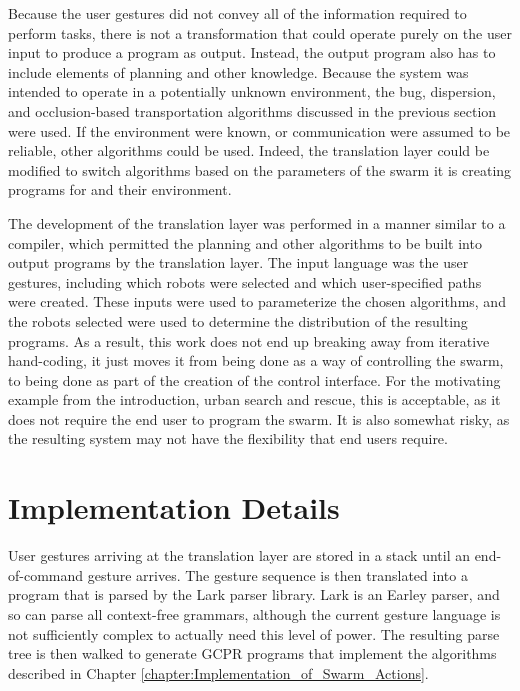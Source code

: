 Because the user gestures did not convey all of the information required to perform tasks, there is not a transformation that could operate purely on the user input to produce a program as output. 
Instead, the output program also has to include elements of planning and other knowledge. 
Because the system was intended to operate in a potentially unknown environment, the bug, dispersion, and occlusion-based transportation algorithms discussed in the previous section were used. 
If the environment were known, or communication were assumed to be reliable, other algorithms could be used. 
Indeed, the translation layer could be modified to switch algorithms based on the parameters of the swarm it is creating programs for and their environment. 

The development of the translation layer was performed in a manner similar to a compiler, which permitted the planning and other algorithms to be built into output programs by the translation layer. 
The input language was the user gestures, including which robots were selected and which user-specified paths were created. 
These inputs were used to parameterize the chosen algorithms, and the robots selected were used to determine the distribution of the resulting programs.
As a result, this work does not end up breaking away from iterative hand-coding, it just moves it from being done as a way of controlling the swarm, to being done as part of the creation of the control interface. 
For the motivating example from the introduction, urban search and rescue, this is acceptable, as it does not require the end user to program the swarm. 
It is also somewhat risky, as the resulting system may not have the flexibility that end users require. 

\section{Implementation Details}

User gestures arriving at the translation layer are stored in a stack until an end-of-command gesture arrives. 
The gesture sequence is then translated into a program that is parsed by the Lark parser library. 
Lark is an Earley parser, and so can parse all context-free grammars, although the current gesture language is not sufficiently complex to actually need this level of power. 
The resulting parse tree is then walked to generate GCPR programs that implement the algorithms described in Chapter \ref{chapter:Implementation_of_Swarm_Actions}.

